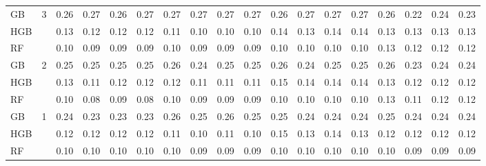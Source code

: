 \documentclass{IEEEtran}
\begin{document}
\begin{table}[th]
\begin{adjustbox}{width=\textwidth}
\begin{tabular}{| l | l | rrrr | rrrr | rrrr | rrrr |}
GB & \multirow{3}{*}{3} & 0.26 & 0.27 & 0.26 & 0.27 & 0.27 & 0.27 & 0.27 & 0.27 & 0.26 & 0.27 & 0.27 & 0.27 & 0.26 & 0.22 & 0.24 & 0.23 \\
HGB &   & 0.13 & 0.12 & 0.12 & 0.12 & 0.11 & 0.10 & 0.10 & 0.10 & 0.14 & 0.13 & 0.14 & 0.14 & 0.13 & 0.13 & 0.13 & 0.13 \\
RF &   & 0.10 & 0.09 & 0.09 & 0.09 & 0.10 & 0.09 & 0.09 & 0.09 & 0.10 & 0.10 & 0.10 & 0.10 & 0.13 & 0.12 & 0.12 & 0.12 \\ \hline
GB & \multirow{3}{*}{2} & 0.25 & 0.25 & 0.25 & 0.25 & 0.26 & 0.24 & 0.25 & 0.25 & 0.26 & 0.24 & 0.25 & 0.25 & 0.26 & 0.23 & 0.24 & 0.24 \\
HGB &   & 0.13 & 0.11 & 0.12 & 0.12 & 0.12 & 0.11 & 0.11 & 0.11 & 0.15 & 0.14 & 0.14 & 0.14 & 0.13 & 0.12 & 0.12 & 0.12 \\
RF &   & 0.10 & 0.08 & 0.09 & 0.08 & 0.10 & 0.09 & 0.09 & 0.09 & 0.10 & 0.10 & 0.10 & 0.10 & 0.13 & 0.11 & 0.12 & 0.12 \\ \hline
GB & \multirow{3}{*}{1} & 0.24 & 0.23 & 0.23 & 0.23 & 0.26 & 0.25 & 0.26 & 0.25 & 0.25 & 0.24 & 0.24 & 0.24 & 0.25 & 0.24 & 0.24 & 0.24 \\
HGB &   & 0.12 & 0.12 & 0.12 & 0.12 & 0.11 & 0.10 & 0.11 & 0.10 & 0.15 & 0.13 & 0.14 & 0.13 & 0.12 & 0.12 & 0.12 & 0.12 \\
RF &   & 0.10 & 0.10 & 0.10 & 0.10 & 0.10 & 0.09 & 0.09 & 0.09 & 0.10 & 0.10 & 0.10 & 0.10 & 0.10 & 0.09 & 0.09 & 0.09 \\ \hline
\end{tabular}
\end{adjustbox}
\end{table}
\end{document}
